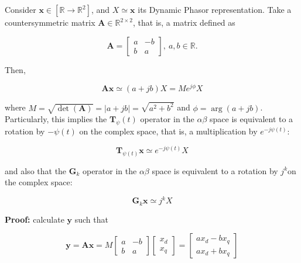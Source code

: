 \begin{theorem} \label{theo:complex_space_operations}%
	Consider $\mathbf{x}\in\left[\mathbb{R}\to\mathbb{R}^2\right]$, and $X \simeq \mathbf{x}$ its Dynamic Phasor representation. Take a countersymmetric matrix $\mathbf{A}\in\mathbb{R}^{2\times 2}$, that is, a matrix defined as

\begin{equation} \mathbf{A} = \left[\begin{array}{cc} a & -b \\ b & a \end{array}\right],\ a,b \in\mathbb{R} \label{eq:countersymmetric_matrix}. \end{equation}

	Then,

\begin{equation} \mathbf{A}\mathbf{x} \simeq \left(a + jb\right)X = Me^{j\phi} X \end{equation}

	\noindent where $M = \sqrt{\det\left(\mathbf{A}\right)} = \left\lvert a + jb\right\rvert = \sqrt{a^2 + b^2}$ and $\phi = \arg\left(a + jb\right)$.  Particularly, this implies the $\mathbf{T}_\psi(t)$ operator in the $\alpha\beta$ space is equivalent to a rotation by $-\psi(t)$ on the complex space, that is, a multiplication by $e^{-j\psi(t)}$:

\begin{equation} \mathbf{T}_{\psi(t)} \mathbf{x} \simeq e^{-j\psi(t)} X \end{equation}

	\noindent and also that the $\mathbf{G}_k$ operator in the $\alpha\beta$ space is equivalent to a rotation by $j^k$on the complex space:

\begin{equation} \mathbf{G}_k \mathbf{x} \simeq j^kX \end{equation}

\end{theorem}
\textbf{Proof:} calculate $\mathbf{y}$ such that

\begin{equation}
	\mathbf{y} = \mathbf{A}\mathbf{x} = M\left[\begin{array}{cc} a & -b \\ b & a \end{array}\right]\left[\begin{array}{c} x_d \\[3mm] x_q\end{array}\right] = \left[\begin{array}{c} ax_d - bx_q \\[3mm] ax_d + bx_q \end{array}\right]
\end{equation}

